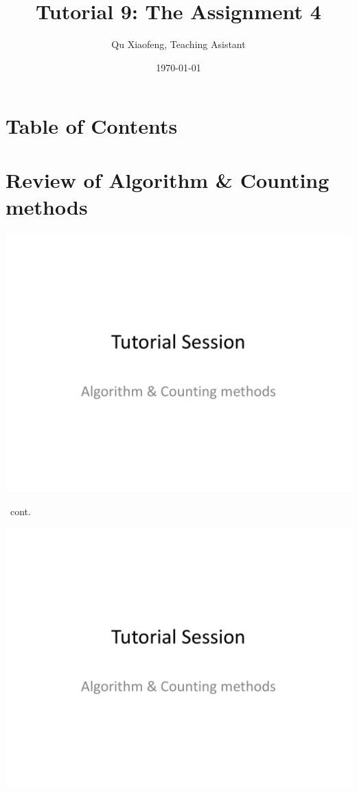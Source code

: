 \documentclass{beamer}
\title[Tutorial 9]{Tutorial 9: The Assignment 4}
\author[COMP210]{Qu Xiaofeng\texorpdfstring{, Teaching Asistant}{}}
\institute{COMP210\\Discrete Structure}
\date{\today}
\begin{document}
\frame{\titlepage}

\section*{Table of Contents}
    \begin{frame}{\secname}
        \tableofcontents
    \end{frame}

\section[Review]{Review of Algorithm \& Counting methods}
    \begin{frame}[c,shrink]{\secname}
        \label{}
        \centerline{\includegraphics[height=0.85\textheight,page=2]{algo_counting}}
    \end{frame}
    \begin{frame}[c,shrink]{\secname\ cont.}
        \centerline{\includegraphics[height=0.85\textheight,page=3]{algo_counting}}
    \end{frame}
\end{document}
